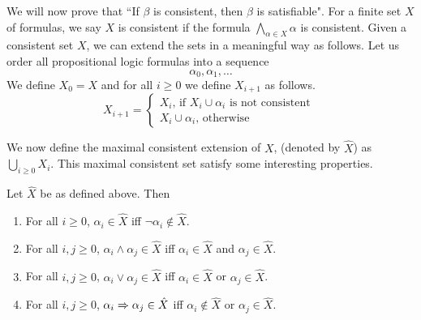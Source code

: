 We will now prove that ``If $\beta$ is consistent, then $\beta$ is satisfiable". For a finite set $X$ of formulas, we say $X$ is consistent if the formula $\bigwedge_{\alpha \in X} \alpha$ is consistent. Given a consistent set $X$, we can extend the sets in a meaningful way as follows. Let us order all propositional logic formulas into a sequence
 \[\alpha_0,\alpha_1,\dots\]
We define $X_0 = X$ and for all $i \geq 0$ we define $X_{i+1}$ as follows.
\[
X_{i+1} = \begin{cases}
X_i \text{, if } X_i \cup \alpha_i \text{ is not consistent } \\
X_i \cup \alpha_i \text{, otherwise}
\end{cases}
\]

We now define the maximal consistent extension of $X$, (denoted by $\hat X$) as $\bigcup_{i \geq 0} X_i$. This maximal consistent set satisfy some interesting properties.
\begin{lemma}
Let $\hat X$ be as defined above. Then
\begin{enumerate}
\item For all  $i \geq 0$, $\alpha_i \in \hat X$ iff $\neg \alpha_i \notin \hat X$. 
\item For all  $i,j \geq 0$, $\alpha_i \wedge \alpha_j \in \hat X$ iff $\alpha_i \in \hat X$ and $\alpha_j \in \hat X$.
\item For all  $i,j \geq 0$, $\alpha_i \vee \alpha_j \in \hat X$ iff $\alpha_i \in \hat X$ or $\alpha_j \in \hat X$.
\item For all  $i,j \geq 0$, $\alpha_i \Rightarrow \alpha_j \in \hat X$ iff $\alpha_i \notin \hat X$ or $\alpha_j \in \hat X$.
\end{enumerate}
\label{lem:mcs}
\end{lemma}
